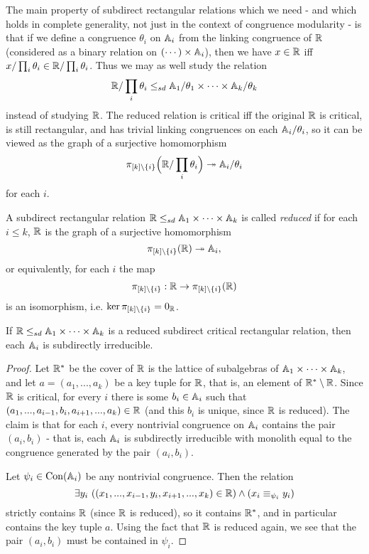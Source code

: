 \documentclass[letterpaper,11pt]{article}
\DeclareMathOperator{\Con}{Con}
\begin{document}
The main property of subdirect rectangular relations which we need - and which holds in complete generality, not just in the context of congruence modularity - is that if we define a congruence $\theta_i$ on $\mathbb{A}_i$ from the linking congruence of $\mathbb{R}$ (considered as a binary relation on $(\cdots)\times \mathbb{A}_i$), then we have $x \in \mathbb{R}$ iff $x/\prod_i \theta_i \in \mathbb{R}/\prod_i \theta_i$. Thus we may as well study the relation
\[
\mathbb{R}/\prod_i \theta_i \le_{sd} \mathbb{A}_1/\theta_1 \times \cdots \times \mathbb{A}_k/\theta_k
\]
instead of studying $\mathbb{R}$. The reduced relation is critical iff the original $\mathbb{R}$ is critical, is still rectangular, and has trivial linking congruences on each $\mathbb{A}_i/\theta_i$, so it can be viewed as the graph of a surjective homomorphism
\[
\pi_{[k]\setminus\{i\}}\Big(\mathbb{R}/\prod_i \theta_i\Big) \twoheadrightarrow \mathbb{A}_i/\theta_i
\]
for each $i$.

\begin{defn} A subdirect rectangular relation $\mathbb{R} \le_{sd} \mathbb{A}_1 \times \cdots \times \mathbb{A}_k$ is called \emph{reduced} if for each $i \le k$, $\mathbb{R}$ is the graph of a surjective homomorphism
\[
\pi_{[k]\setminus\{i\}}(\mathbb{R}) \twoheadrightarrow \mathbb{A}_i,
\]
or equivalently, for each $i$ the map
\[
\pi_{[k]\setminus \{i\}} : \mathbb{R} \rightarrow \pi_{[k]\setminus\{i\}}(\mathbb{R})
\]
is an isomorphism, i.e. $\ker \pi_{[k]\setminus \{i\}} = 0_{\mathbb{R}}$.
\end{defn}

\begin{prop} If $\mathbb{R} \le_{sd} \mathbb{A}_1 \times \cdots \times \mathbb{A}_k$ is a reduced subdirect critical rectangular relation, then each $\mathbb{A}_i$ is subdirectly irreducible.
\end{prop}
\begin{proof} Let $\mathbb{R}^*$ be the cover of $\mathbb{R}$ is the lattice of subalgebras of $\mathbb{A}_1 \times \cdots \times \mathbb{A}_k$, and let $a = (a_1, ..., a_k)$ be a key tuple for $\mathbb{R}$, that is, an element of $\mathbb{R}^*\setminus \mathbb{R}$. Since $\mathbb{R}$ is critical, for every $i$ there is some $b_i \in \mathbb{A}_i$ such that $(a_1, ..., a_{i-1}, b_i, a_{i+1}, ..., a_k) \in \mathbb{R}$ (and this $b_i$ is unique, since $\mathbb{R}$ is reduced). The claim is that for each $i$, every nontrivial congruence on $\mathbb{A}_i$ contains the pair $(a_i,b_i)$ - that is, each $\mathbb{A}_i$ is subdirectly irreducible with monolith equal to the congruence generated by the pair $(a_i,b_i)$.

Let $\psi_i \in \Con(\bA_i)$ be any nontrivial congruence. Then the relation
\[
\exists y_i\ ((x_1, ..., x_{i-1}, y_i, x_{i+1}, ..., x_k) \in \mathbb{R}) \wedge (x_i \equiv_{\psi_i} y_i)
\]
strictly contains $\mathbb{R}$ (since $\mathbb{R}$ is reduced), so it contains $\mathbb{R}^*$, and in particular contains the key tuple $a$. Using the fact that $\mathbb{R}$ is reduced again, we see that the pair $(a_i,b_i)$ must be contained in $\psi_i$.
\end{proof}
\end{document}
